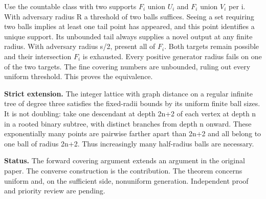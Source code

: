 \documentclass[11pt]{article}
\begin{document}
Use the countable class with two supports \(F_{i}\) union \(U_{i}\) and \(F_{i}\) union \(V_{i}\) per i. With adversary radius R a threshold of two balls suffices. Seeing a set requiring two balls implies at least one tail point has appeared, and this point identifies a unique support. Its unbounded tail always supplies a novel output at any finite radius. With adversary radius s/2, present all of \(F_{i}\). Both targets remain possible and their intersection \(F_{i}\) is exhausted. Every positive generator radius fails on one of the two targets. The fine covering numbers are unbounded, ruling out every uniform threshold. This proves the equivalence.

\textbf{Strict extension.} The integer lattice with graph distance on a regular infinite tree of degree three satisfies the fixed-radii bounds by its uniform finite ball sizes. It is not doubling: take one descendant at depth 2n+2 of each vertex at depth n in a rooted binary subtree, with distinct branches from depth n onward. These exponentially many points are pairwise farther apart than 2n+2 and all belong to one ball of radius 2n+2. Thus increasingly many half-radius balls are necessary.

\textbf{Status.} The forward covering argument extends an argument in the original paper. The converse construction is the contribution. The theorem concerns uniform and, on the sufficient side, nonuniform generation. Independent proof and priority review are pending.
\end{document}
